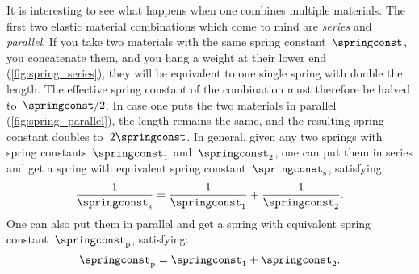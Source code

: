 It is interesting to see what happens when one combines multiple materials. The first two elastic material combinations which come to mind are \emph{series} and \emph{parallel}.
If you take two materials with the same spring constant~$\springconst$, you concatenate them, and you hang a weight at their lower end (\cref{fig:spring_series}), they will be equivalent to one single spring with double the length.
The effective spring constant of the combination must therefore be halved to~$\springconst/2$.
In case one puts the two materials in parallel (\cref{fig:spring_parallel}), the length remains the same, and the resulting spring constant doubles to~$2\springconst$.
In general, given any two springs with spring constants~$\springconst_1$ and~$\springconst_2$, one can put them in series and get a spring with equivalent spring constant~$\springconst_{\mathrm{s}}$, satisfying:
\begin{equation*}
  \frac{1}{\springconst_\mathrm{s}}=\frac{1}{\springconst_1}+\frac{1}{\springconst_2}.
\end{equation*}
One can also put them in parallel and get a spring with equivalent spring constant~$\springconst_\mathrm{p}$, satisfying:
\begin{equation*}
  \springconst_\mathrm{p}=\springconst_1+\springconst_2.
\end{equation*}


\begin{figure}[h]
  \hspace{1cm}
\end{figure}

